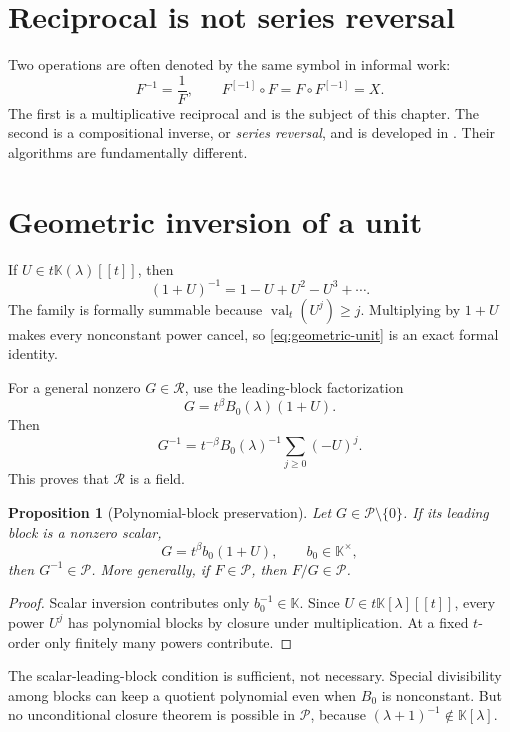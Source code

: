 \documentclass[11pt,openany]{book}
\theoremstyle{definition}
\theoremstyle{plain}
\newtheorem{proposition}{Proposition}[chapter]
\theoremstyle{remark}
\newcommand{\K}{\mathbb{K}}
\newcommand{\Plog}{\mathscr{P}}
\newcommand{\Rlog}{\mathscr{R}}
\newcommand{\invcomp}{^{[-1]}}
\DeclareMathOperator{\val}{val}
\begin{document}
\section{Reciprocal is not series reversal}
Two operations are often denoted by the same symbol in informal work:
\[
 F^{-1}=\frac1F,
 \qquad
 F\invcomp\circ F=F\circ F\invcomp=X.
\]
The first is a multiplicative reciprocal and is the subject of this chapter. The second is a compositional inverse, or \emph{series reversal}, and is developed in . Their algorithms are fundamentally different.

\section{Geometric inversion of a unit}
If \(U\in t\K(\lambda)[[t]]\), then
\begin{equation}\label{eq:geometric-unit}
 (1+U)^{-1}=1-U+U^2-U^3+\cdots.
\end{equation}
The family is formally summable because \(\val_t(U^j)\ge j\). Multiplying by \(1+U\) makes every nonconstant power cancel, so \cref{eq:geometric-unit} is an exact formal identity.

For a general nonzero \(G\in\Rlog\), use the leading-block factorization
\[
 G=t^\beta B_0(\lambda)(1+U).
\]
Then
\begin{equation}\label{eq:general-reciprocal}
 G^{-1}=t^{-\beta}B_0(\lambda)^{-1}
 \sum_{j\ge0}(-U)^j.
\end{equation}
This proves that \(\Rlog\) is a field.

\begin{proposition}[Polynomial-block preservation]\label{prop:poly-division}
Let \(G\in\Plog\setminus\{0\}\). If its leading block is a nonzero scalar,
\[
 G=t^\beta b_0(1+U),\qquad b_0\in\K^\times,
\]
then \(G^{-1}\in\Plog\). More generally, if \(F\in\Plog\), then \(F/G\in\Plog\).
\end{proposition}

\begin{proof}
Scalar inversion contributes only \(b_0^{-1}\in\K\). Since \(U\in t\K[\lambda][[t]]\), every power \(U^j\) has polynomial blocks by closure under multiplication. At a fixed \(t\)-order only finitely many powers contribute.
\end{proof}

The scalar-leading-block condition is sufficient, not necessary. Special divisibility among blocks can keep a quotient polynomial even when \(B_0\) is nonconstant. But no unconditional closure theorem is possible in \(\Plog\), because \((\lambda+1)^{-1}\notin\K[\lambda]\).
\end{document}
